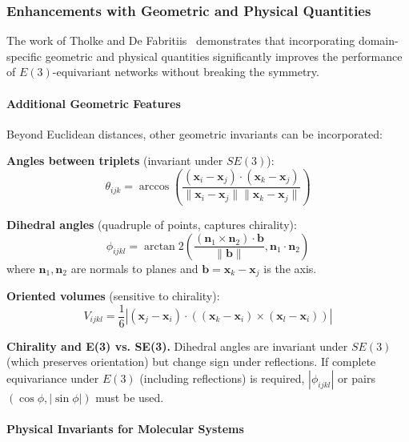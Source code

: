 \subsubsection{Enhancements with Geometric and Physical Quantities}

The work of Tholke and De Fabritiis~\citep{tholke2022geometric} demonstrates that incorporating domain-specific geometric and physical quantities significantly improves the performance of $E(3)$-equivariant networks without breaking the symmetry.

\paragraph{Additional Geometric Features}

Beyond Euclidean distances, other geometric invariants can be incorporated:

\textbf{Angles between triplets} (invariant under $SE(3)$):
\begin{equation}
\theta_{ijk} = \arccos\left(\frac{(\mathbf{x}_i - \mathbf{x}_j) \cdot (\mathbf{x}_k - \mathbf{x}_j)}{\|\mathbf{x}_i - \mathbf{x}_j\| \|\mathbf{x}_k - \mathbf{x}_j\|}\right)
\end{equation}

\textbf{Dihedral angles} (quadruple of points, captures chirality):
\begin{equation}
\phi_{ijkl} = \arctan2\left(\frac{(\mathbf{n}_1 \times \mathbf{n}_2) \cdot \mathbf{b}}{\|\mathbf{b}\|}, \mathbf{n}_1 \cdot \mathbf{n}_2\right)
\end{equation}
where $\mathbf{n}_1, \mathbf{n}_2$ are normals to planes and $\mathbf{b} = \mathbf{x}_k - \mathbf{x}_j$ is the axis.

\textbf{Oriented volumes} (sensitive to chirality):
\begin{equation}
V_{ijkl} = \frac{1}{6} \left|(\mathbf{x}_j - \mathbf{x}_i) \cdot \left((\mathbf{x}_k - \mathbf{x}_i) \times (\mathbf{x}_l - \mathbf{x}_i)\right)\right|
\end{equation}

\textbf{Chirality and E(3) vs. SE(3).} Dihedral angles are invariant under $SE(3)$ (which preserves orientation) but change sign under reflections. If complete equivariance under $E(3)$ (including reflections) is required, $|\phi_{ijkl}|$ or pairs $(\cos \phi, |\sin \phi|)$ must be used.

\paragraph{Physical Invariants for Molecular Systems}

